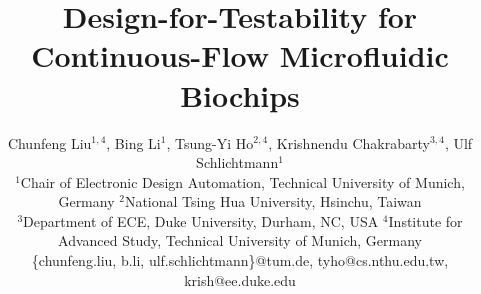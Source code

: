 \documentclass[9pt,sigconf]{acmart}
\begin{document}


\graphicspath{{Fig/}}
\def\figname{Figure}
\def\algname{Algorithm}
\newcommand{\figurefontsize}{\small}

\pagestyle{empty}



\newcommand{\papertitle}{Design-for-Testability for Continuous-Flow Microfluidic Biochips}


\title{\papertitle}

\author{
Chunfeng Liu$^{1,4}$, Bing Li$^1$, 
Tsung-Yi Ho$^{2,4}$, 
Krishnendu Chakrabarty$^{3,4}$, 
Ulf Schlichtmann$^1$\\
\normalsize 
$^1$Chair of Electronic Design Automation, Technical University of
Munich, Germany\hskip 10pt $^2$National Tsing Hua University, Hsinchu, Taiwan \\
$^3$Department of ECE, Duke University, Durham, NC, USA \hskip 10pt 
$^4$Institute for Advanced Study, Technical University of Munich, 
Germany\\
\{chunfeng.liu, b.li, ulf.schlichtmann\}@tum.de, tyho@cs.nthu.edu.tw, krish@ee.duke.edu
}



\maketitle













\end{document}
